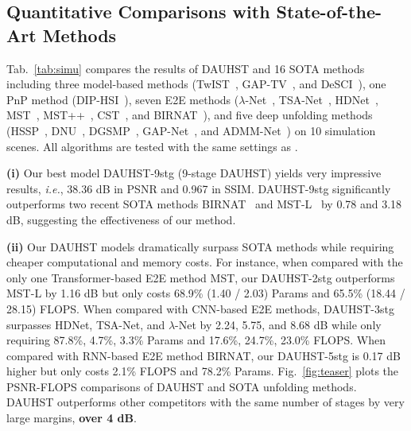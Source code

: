 \documentclass{article}
\begin{document}
\vspace{-1.5mm}
\subsection{Quantitative Comparisons with State-of-the-Art Methods}
\vspace{-1.5mm}

Tab.~\ref{tab:simu} compares the results of DAUHST and 16 SOTA methods including three model-based methods (TwIST~\cite{twist}, GAP-TV~\cite{gap_tv}, and DeSCI~\cite{desci}), one PnP method (DIP-HSI~\cite{self}), seven E2E methods ($\lambda$-Net~\cite{lambda}, TSA-Net~\cite{tsa_net}, HDNet~\cite{hdnet}, MST~\cite{mst}, MST++~\cite{mst_pp}, CST~\cite{cst}, and BIRNAT~\cite{birnat}), and five deep unfolding methods (HSSP~\cite{hssp}, DNU~\cite{dnu}, DGSMP~\cite{gsm}, GAP-Net~\cite{gapnet}, and ADMM-Net~\cite{admm-net}) on 10 simulation scenes. All algorithms are tested with the same settings as \cite{gsm,mst}.

\textbf{(i)} Our best model DAUHST-9stg (9-stage DAUHST) yields very impressive results, \emph{i.e.}, 38.36 dB in PSNR and 0.967 in SSIM. DAUHST-9stg significantly outperforms two recent SOTA methods BIRNAT~\cite{birnat} and MST-L~\cite{mst} by 0.78 and 3.18 dB, suggesting the effectiveness of our method.  

\textbf{(ii)} Our DAUHST models dramatically surpass SOTA methods while requiring cheaper computational and memory costs. For instance, when compared with the only one Transformer-based E2E method MST, our DAUHST-2stg outperforms MST-L by 1.16 dB but only costs 68.9\% (1.40 / 2.03) Params and 65.5\% (18.44 / 28.15) FLOPS.  When compared with CNN-based E2E methods,  DAUHST-3stg  surpasses HDNet, TSA-Net, and $\lambda$-Net by 2.24, 5.75, and 8.68 dB while only requiring 87.8\%, 4.7\%, 3.3\% Params and 17.6\%, 24.7\%, 23.0\% FLOPS. When compared with RNN-based E2E method BIRNAT, our DAUHST-5stg is 0.17 dB higher but only costs  2.1\% FLOPS and 78.2\% Params. Fig.~\ref{fig:teaser}  plots the PSNR-FLOPS comparisons of DAUHST and SOTA unfolding methods.  DAUHST  outperforms other competitors with the same number of stages  by very large margins, \textbf{over 4 dB}.  


\vspace{-1.5mm}
\end{document}
